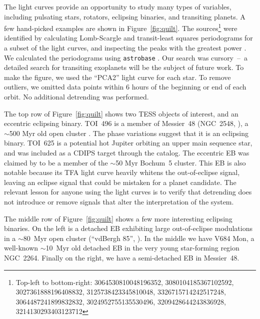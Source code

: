 \documentclass[12pt,twocolumn,tighten]{aastex62}
\begin{document}
The light curves provide an opportunity to study many types of
variables, including pulsating stars, rotators, eclipsing binaries,
and transiting planets.  A few hand-picked examples are shown in
Figure~\ref{fig:quilt}.
The sources\footnote{
	Top-left to bottom-right:
	3064530810048196352, 
	3080104185367102592, 
	3027361888196408832,
	3125738423345810048,
	3326715714242517248,
	3064487241899832832,
	3024952755135530496,
  3209428644243836928,
  3214130293403123712 
} were identified by calculating Lomb-Scargle and transit-least
squares periodograms for a subset of the light curves, and inspecting
the peaks with the greatest power
\citep{lomb_1976,scargle_studies_1982,kovacs_box-fitting_2002,vanderplas_periodograms_2015,hippke_TLS_2019}.
We calculated the periodograms using \texttt{astrobase}
\citep{bhatti_astrobase_2018}.  Our search was cursory~--~a detailed
search for transiting exoplanets will be the subject of future work.
To make the figure, we used the ``PCA2'' light curve for each star.
To remove outliers, we omitted data points within 6 hours of the
beginning or end of each orbit.  No additional detrending was
performed.

The top row of Figure~\ref{fig:quilt} shows two TESS objects of
interest, and an eccentric eclipsing binary.  TOI~496 is a member of
Messier~48 (NGC~2548,
\citealt{gaia_collaboration_gaia_2018,cantat-gaudin_gaia_2018}), a
$\sim$500 Myr old open cluster \citep{Kharchenko_et_al_2013}.  The
phase variations suggest that it is an eclipsing binary.  TOI~625 is a
potential hot Jupiter orbiting an upper main sequence star, and was
included as a CDIPS target through the \citet{zari_3d_2018} catalog.
The eccentric EB was claimed by \citet{dias_proper_2014} to be a
member of the $\sim$50 Myr Bochum~5 cluster.  This EB is also notable
because its TFA light curve heavily whitens the out-of-eclipse signal,
leaving an eclipse signal that could be mistaken for a planet
candidate.  The relevant lesson for anyone using the light curves is
to verify that detrending does not introduce or remove signals that
alter the interpretation of the system.

The middle row of Figure~\ref{fig:quilt} shows a few more interesting
eclipsing binaries.  On the left is a detached EB exhibiting large
out-of-eclipse modulations in a $\sim$80~Myr open cluster (``vdBergh
85'', \citealt{Kharchenko_et_al_2013}).  In the middle we have V684
Mon, a well-known $\sim$10~Myr old detached EB in the very young
star-forming region NGC~2264.  Finally on the right, we have a
semi-detached EB in Messier~48.
\end{document}
